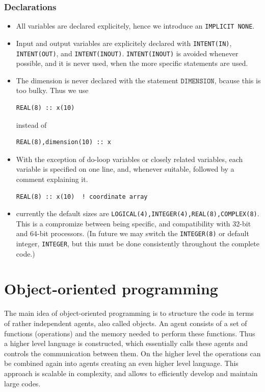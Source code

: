 \documentclass[a4paper,10pt]{report}
\begin{document}
\subsection{Declarations}
\begin{itemize}
\item All variables are declared explicitely, hence we introduce an
\texttt{IMPLICIT NONE}.

\item Input and output variables are explicitely declared with
\texttt{INTENT(IN)}, \texttt{INTENT(OUT)}, and
\texttt{INTENT(INOUT)}. \texttt{INTENT(INOUT)} is avoided whenever
possible, and it is never used, when the more specific statements are
used.

\item The dimension is never declared with the statement
$\texttt{DIMENSION}$, bcause this is too bulky.
Thus we use
{\small
\begin{verbatim}
REAL(8) :: x(10)
\end{verbatim}}
instead of
{\small
\begin{verbatim}
REAL(8),dimension(10) :: x
\end{verbatim}}

\item   With the exception of do-loop variables or closely related
  variables, each variable is specified on one line, and, whenever
  suitable, followed by a comment explaining it.  {\small
\begin{verbatim}
REAL(8) :: x(10)  ! coordinate array
\end{verbatim}}

  \item currently the default sizes are
    \texttt{LOGICAL(4),INTEGER(4),REAL(8),COMPLEX(8)}. This is a
    compromize between being specific, and compatibility with 32-bit
    and 64-bit processors. (In future we may switch the
    \texttt{INTEGER(8)} or default integer, \texttt{INTEGER}, but this
    must be done consistently throughout the complete code.)

\end{itemize}


\chapter{Object-oriented programming}
The main idea of object-oriented programming is to structure the code
in terms of rather independent agents, also called objects. An agent
consists of a set of functions (operations) and the memory needed to
perform these functions. Thus a higher level language is constructed,
which essentially calls these agents and controls the communication
between them. On the higher level the operations can be combined again
into agents creating an even higher level language. This approach is
scalable in complexity, and allows to efficiently develop and maintain
large codes.
\end{document}
